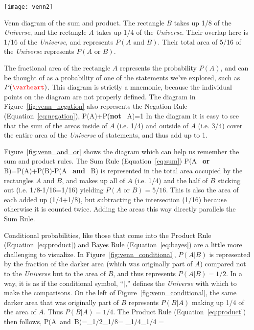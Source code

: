 \begin{marginfigure}
\texttt{[image: venn2]}
\caption{Venn diagram of the sum and product. The rectangle $B$ takes up 1/8 of the {\em Universe}, and the rectangle $A$ takes up 1/4 of the {\em Universe}.  Their overlap here is 1/16 of the {\em Universe}, and represents $P(A \mbox{ and } B)$.  Their total area of 5/16 of the {\em Universe} represents $P(A \mbox{ or } B)$.}
\label{fig:venn_and_or}
\end{marginfigure}
The fractional area of the rectangle $A$ represents the probability $P(A)$, and can be thought of as a probability of one of the statements we've explored, such as $P(\hearts)$.  This diagram is strictly a mnemonic, because the individual points on the diagram are not properly defined.  The diagram in Figure~\ref{fig:venn_negation} also represents the Negation Rule (Equation~\ref{eq:negation}),
\beqn
P(A)+P(\mbox{{\bf not} } A)=1
\eeqn
In the diagram it is easy to see that the sum of the areas inside of $A$ (i.e. 1/4) and outside of $A$ (i.e. 3/4) cover the entire area of the {\em Universe} of statements, and thus add up to 1. 

Figure~\ref{fig:venn_and_or} shows the diagram which can help us remember the sum and product rules.  The Sum Rule (Equation~\ref{eq:sum})
\beqn
P(A \mbox{ \bf or } B)=P(A)+P(B)-P(A \mbox{ \bf and } B)
\eeqn
is represented in the total area occupied by the rectangles $A$ and $B$, and makes up all of $A$ (i.e. 1/4) and the half of $B$ sticking out (i.e. 1/8-1/16=1/16) yielding $P(A \mbox{ or } B)=5/16$.  This is also the area of each added up (1/4+1/8), but subtracting the intersection (1/16) because otherwise it is counted twice.  Adding the areas this way directly parallels the Sum Rule.  

Conditional probabilities, like those that come into the Product Rule (Equation~\ref{eq:product}) and Bayes Rule (Equation~\ref{eq:bayes}) are a little more challenging to visualize.  In Figure~\ref{fig:venn_conditional}, $P(A|B)$ is represented by the fraction of the darker area (which was originally part of $A$) compared not to the {\em Universe} but to the area of $B$, and thus represents $P(A|B)=1/2$.  In a way, it is as if the conditional symbol, ``$|$,'' defines the {\em Universe} with which to make the comparisons.  On the left of Figure~\ref{fig:venn_conditional}, the same darker area that was originally part of $B$ represents $P(B|A)$ making up 1/4 of the area of $A$.  Thus $P(B|A)=1/4$.  The Product Rule (Equation~\ref{eq:product}) then follows,
\beqn
P(A\mbox{ and }B)=_{1/2}_{1/8}= _{1/4}_{1/4} = 
\eeqn

